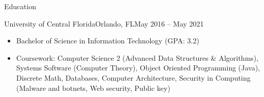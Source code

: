 \documentclass[calibri]{mcdowellcv}
\begin{document}
	\begin{cvsection}{Education}
		\begin{cvsubsection}{University of Central Florida}{Orlando, FL}{May 2016 -- May 2021}
			\begin{itemize}
				\item Bachelor of Science in Information Technology (GPA: 3.2)
				\item Coursework: Computer Science 2 (Advanced Data Structures \& Algorithms), Systems Software (Computer Theory), Object Oriented Programming (Java), Discrete Math, Databases, Computer Architecture, Security in Computing (Malware and botnets, Web security, Public key)
			\end{itemize}
		\end{cvsubsection}
	\end{cvsection}
	
\end{document}
